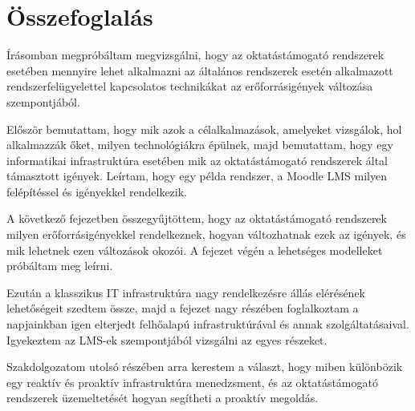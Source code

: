 \chapter{Összefoglalás}

Írásomban megpróbáltam megvizsgálni, hogy az oktatástámogató rendszerek esetében mennyire lehet alkalmazni az általános rendszerek esetén alkalmazott rendszerfelügyelettel kapcsolatos technikákat az erőforrásigények változása szempontjából.

Először bemutattam, hogy mik azok a célalkalmazások, amelyeket vizsgálok, hol alkalmazzák őket, milyen technológiákra épülnek, majd bemutattam, hogy egy informatikai infrastruktúra esetében mik az oktatástámogató rendszerek által támasztott igények. Leírtam, hogy egy példa rendszer, a Moodle LMS milyen felépítéssel és igényekkel rendelkezik.

A következő fejezetben összegyűjtöttem, hogy az oktatástámogató rendszerek milyen erőforrásigényekkel rendelkeznek, hogyan változhatnak ezek az igények, és mik lehetnek ezen változások okozói. A fejezet végén a lehetséges modelleket próbáltam meg leírni.

Ezután a klasszikus IT infrastruktúra nagy rendelkezésre állás elérésének lehetőségeit szedtem össze, majd a fejezet nagy részében foglalkoztam a napjainkban igen elterjedt felhőalapú infrastruktúrával és annak szolgáltatásaival. Igyekeztem az LMS-ek szempontjából vizsgálni az egyes részeket.

Szakdolgozatom utolsó részében arra kerestem a választ, hogy miben különbözik egy reaktív és proaktív infrastruktúra menedzsment, és az oktatástámogató rendszerek üzemeltetését hogyan segítheti a proaktív megoldás.

